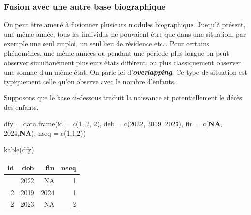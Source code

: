 \documentclass[
  12pt,
  letterpaper,
  DIV=11,
  numbers=noendperiod,
  onepage,
  openany]{scrreprt}
\newenvironment{Shaded}{\begin{snugshade}}{\end{snugshade}}
\newcommand{\AttributeTok}[1]{\textcolor[rgb]{0.80,0.80,0.80}{#1}}
\newcommand{\ConstantTok}[1]{\textcolor[rgb]{0.86,0.64,0.64}{\textbf{#1}}}
\newcommand{\DecValTok}[1]{\textcolor[rgb]{0.86,0.86,0.80}{#1}}
\newcommand{\FunctionTok}[1]{\textcolor[rgb]{0.94,0.94,0.56}{#1}}
\newcommand{\NormalTok}[1]{\textcolor[rgb]{0.80,0.80,0.80}{#1}}
\newcommand{\OtherTok}[1]{\textcolor[rgb]{0.94,0.94,0.56}{#1}}
\begin{document}
\hypertarget{fusion-avec-une-autre-base-biographique}{%
\subsubsection{Fusion avec une autre base
biographique}\label{fusion-avec-une-autre-base-biographique}}

On peut être amené à fusionner plusieurs modules biographique. Jusqu'à
présent, une même année, tous les individus ne pouvaient être que dans
une situation, par exemple une seul emploi, un seul lieu de résidence
etc\ldots{} Pour certains phénomènes, une même années ou pendant une
période plus longue on peut observer simultanément plusieurs états
différent, ou plus classiquement observer une somme d'un même état. On
parle ici d'\textbf{\emph{overlapping}}. Ce type de situation est
typiquement celle qu'on observe avec le nombre d'enfants.

Supposons que le base ci-dessous traduit la naissance et potentiellement
le décès des enfants.

\begin{Shaded}
\begin{Highlighting}[]
\NormalTok{dfy }\OtherTok{=} \FunctionTok{data.frame}\NormalTok{(}\AttributeTok{id  =}  \FunctionTok{c}\NormalTok{(}\DecValTok{1}\NormalTok{, }\DecValTok{2}\NormalTok{, }\DecValTok{2}\NormalTok{),}
                \AttributeTok{deb =}  \FunctionTok{c}\NormalTok{(}\DecValTok{2022}\NormalTok{, }\DecValTok{2019}\NormalTok{, }\DecValTok{2023}\NormalTok{),}
                \AttributeTok{fin =}  \FunctionTok{c}\NormalTok{(}\ConstantTok{NA}\NormalTok{, }\DecValTok{2024}\NormalTok{,}\ConstantTok{NA}\NormalTok{), }
                \AttributeTok{nseq =}  \FunctionTok{c}\NormalTok{(}\DecValTok{1}\NormalTok{,}\DecValTok{1}\NormalTok{,}\DecValTok{2}\NormalTok{))}

\FunctionTok{kable}\NormalTok{(dfy)}
\end{Highlighting}
\end{Shaded}

\begin{longtable}[]{@{}rrrr@{}}
\toprule\noalign{}
id & deb & fin & nseq \\
\midrule\noalign{}
\endhead
\bottomrule\noalign{}
\endlastfoot
1 & 2022 & NA & 1 \\
2 & 2019 & 2024 & 1 \\
2 & 2023 & NA & 2 \\
\end{longtable}
\end{document}
